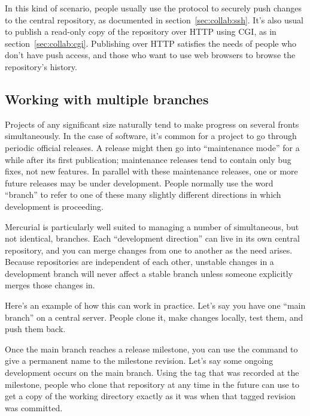 In this kind of scenario, people usually use the 
protocol to securely push changes to the central repository, as
documented in section~\ref{sec:collab:ssh}.  It's also usual to
publish a read-only copy of the repository over HTTP using CGI, as in
section~\ref{sec:collab:cgi}.  Publishing over HTTP satisfies the
needs of people who don't have push access, and those who want to use
web browsers to browse the repository's history.

\subsection{Working with multiple branches}

Projects of any significant size naturally tend to make progress on
several fronts simultaneously.  In the case of software, it's common
for a project to go through periodic official releases.  A release
might then go into ``maintenance mode'' for a while after its first
publication; maintenance releases tend to contain only bug fixes, not
new features.  In parallel with these maintenance releases, one or
more future releases may be under development.  People normally use
the word ``branch'' to refer to one of these many slightly different
directions in which development is proceeding.

Mercurial is particularly well suited to managing a number of
simultaneous, but not identical, branches.  Each ``development
direction'' can live in its own central repository, and you can merge
changes from one to another as the need arises.  Because repositories
are independent of each other, unstable changes in a development
branch will never affect a stable branch unless someone explicitly
merges those changes in.

Here's an example of how this can work in practice.  Let's say you
have one ``main branch'' on a central server.
People clone it, make changes locally, test them, and push them back.

Once the main branch reaches a release milestone, you can use the
 command to give a permanent name to the milestone
revision.
Let's say some ongoing development occurs on the main branch.
Using the tag that was recorded at the milestone, people who clone
that repository at any time in the future can use  to
get a copy of the working directory exactly as it was when that tagged
revision was committed.  

